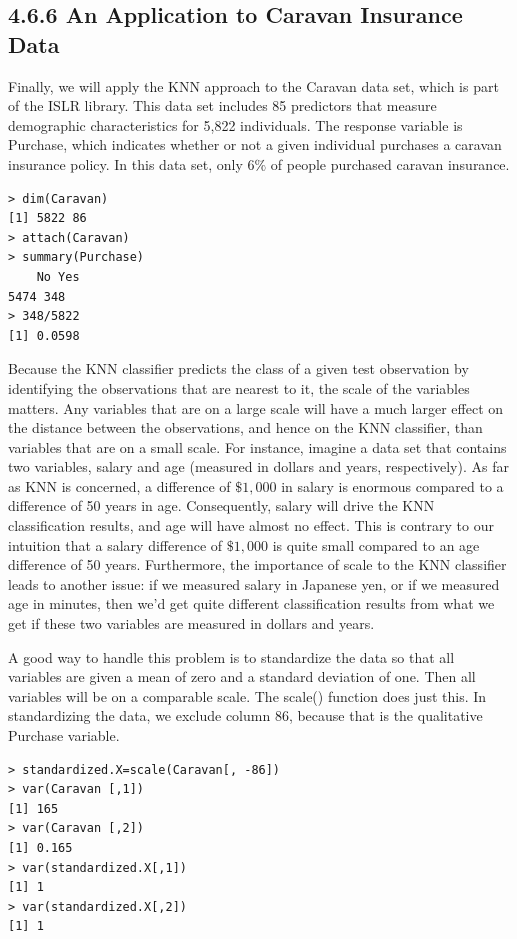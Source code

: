 \documentclass[10pt]{article}
\begin{document}
\subsection*{4.6.6 An Application to Caravan Insurance Data}
Finally, we will apply the KNN approach to the Caravan data set, which is part of the ISLR library. This data set includes 85 predictors that measure\\
demographic characteristics for 5,822 individuals. The response variable is Purchase, which indicates whether or not a given individual purchases a caravan insurance policy. In this data set, only $6 \%$ of people purchased caravan insurance.

\begin{verbatim}
> dim(Caravan)
[1] 5822 86
> attach(Caravan)
> summary(Purchase)
    No Yes
5474 348
> 348/5822
[1] 0.0598
\end{verbatim}

Because the KNN classifier predicts the class of a given test observation by identifying the observations that are nearest to it, the scale of the variables matters. Any variables that are on a large scale will have a much larger effect on the distance between the observations, and hence on the KNN classifier, than variables that are on a small scale. For instance, imagine a data set that contains two variables, salary and age (measured in dollars and years, respectively). As far as KNN is concerned, a difference of $\$ 1,000$ in salary is enormous compared to a difference of 50 years in age. Consequently, salary will drive the KNN classification results, and age will have almost no effect. This is contrary to our intuition that a salary difference of $\$ 1,000$ is quite small compared to an age difference of 50 years. Furthermore, the importance of scale to the KNN classifier leads to another issue: if we measured salary in Japanese yen, or if we measured age in minutes, then we'd get quite different classification results from what we get if these two variables are measured in dollars and years.

A good way to handle this problem is to standardize the data so that all variables are given a mean of zero and a standard deviation of one. Then all variables will be on a comparable scale. The scale() function does just this. In standardizing the data, we exclude column 86, because that is the qualitative Purchase variable.

\begin{verbatim}
> standardized.X=scale(Caravan[, -86])
> var(Caravan [,1])
[1] 165
> var(Caravan [,2])
[1] 0.165
> var(standardized.X[,1])
[1] 1
> var(standardized.X[,2])
[1] 1
\end{verbatim}
\end{document}
